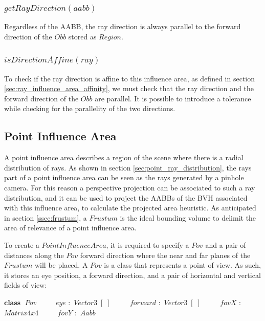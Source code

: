 \documentclass{PoliMi_MasterThesis}
\newcommand*\Class[1]{\State $\textbf{class} \;$ #1}
\newcommand*\Member[2]{\State $\qquad$ #1 $:$ #2}
\begin{document}
\subsubsection*{$getRayDirection(aabb)$}
Regardless of the AABB, the ray direction is always parallel to the forward direction of the $Obb$ stored as $Region$.

\subsubsection*{$isDirectionAffine(ray)$}
To check if the ray direction is affine to this influence area, as defined in section \ref{sec:ray_influence_area_affinity}, we must check that the ray direction and the forward direction of the $Obb$ are parallel. It is possible to introduce a tolerance while checking for the parallelity of the two directions.

\subsection{Point Influence Area} \label{ssec:point_influence_area}
A point influence area describes a region of the scene where there is a radial distribution of rays. As shown in section \ref{sec:point_ray_distribution}, the rays part of a point influence area can be seen as the rays generated by a pinhole camera. For this reason a perspective projection can be associated to such a ray distribution, and it can be used to project the AABBs of the BVH associated with this influence area, to calculate the projected area heuristic. As anticipated in section \ref{ssec:frustum}, a $Frustum$ is the ideal bounding volume to delimit the area of relevance of a point influence area.

To create a $PointInfluenceArea$, it is required to specify a $Pov$ and a pair of distances along the $Pov$ forward direction where the near and far planes of the $Frustum$ will be placed. A $Pov$ is a class that represents a point of view. As such, it stores an eye position, a forward direction, and a pair of horizontal and vertical fields of view:

\begin{algorithm}[H]
	\begin{algorithmic}
		\Class{$Pov$}
		\Member{$eye$}{$Vector3\;[\;]$}
		\Member{$forward$}{$Vector3\;[\;]$}
		\Member{$fovX$}{$Matrix4x4$}
		\Member{$fovY$}{$Aabb$}
	\end{algorithmic}
\end{algorithm} 
\end{document}
